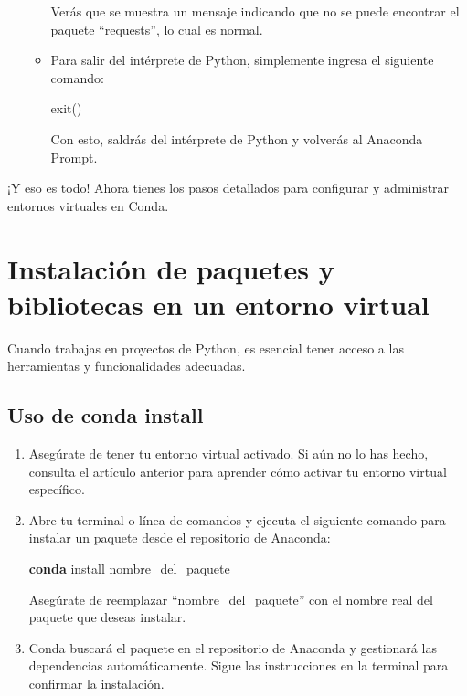 \documentclass[
  letterpaper,
  DIV=11,
  numbers=noendperiod]{scrartcl}
\newenvironment{Shaded}{}{}
\newcommand{\ExtensionTok}[1]{\textcolor[rgb]{0.84,0.23,0.29}{\textbf{#1}}}
\newcommand{\NormalTok}[1]{\textcolor[rgb]{0.14,0.16,0.18}{#1}}
\begin{document}
\begin{enumerate}
\begin{itemize}
    Verás que se muestra un mensaje indicando que no se puede encontrar
    el paquete ``requests'', lo cual es normal.
  \item
    Para salir del intérprete de Python, simplemente ingresa el
    siguiente comando:

\begin{Shaded}
\begin{Highlighting}[]
\NormalTok{exit()}
\end{Highlighting}
\end{Shaded}

    Con esto, saldrás del intérprete de Python y volverás al Anaconda
    Prompt.
  \end{itemize}
\end{enumerate}

¡Y eso es todo! Ahora tienes los pasos detallados para configurar y
administrar entornos virtuales en Conda.

\hypertarget{instalaciuxf3n-de-paquetes-y-bibliotecas-en-un-entorno-virtual}{%
\section{Instalación de paquetes y bibliotecas en un entorno
virtual}\label{instalaciuxf3n-de-paquetes-y-bibliotecas-en-un-entorno-virtual}}

Cuando trabajas en proyectos de Python, es esencial tener acceso a las
herramientas y funcionalidades adecuadas.

\hypertarget{uso-de-conda-install}{%
\subsection{Uso de conda install}\label{uso-de-conda-install}}

\begin{enumerate}
\def\labelenumi{\arabic{enumi}.}
\item
  Asegúrate de tener tu entorno virtual activado. Si aún no lo has
  hecho, consulta el artículo anterior para aprender cómo activar tu
  entorno virtual específico.
\item
  Abre tu terminal o línea de comandos y ejecuta el siguiente comando
  para instalar un paquete desde el repositorio de Anaconda:

\begin{Shaded}
\begin{Highlighting}[]
\ExtensionTok{conda}\NormalTok{ install nombre\_del\_paquete}
\end{Highlighting}
\end{Shaded}

  Asegúrate de reemplazar ``nombre\_del\_paquete'' con el nombre real
  del paquete que deseas instalar.
\item
  Conda buscará el paquete en el repositorio de Anaconda y gestionará
  las dependencias automáticamente. Sigue las instrucciones en la
  terminal para confirmar la instalación.
\end{enumerate}
\end{document}
